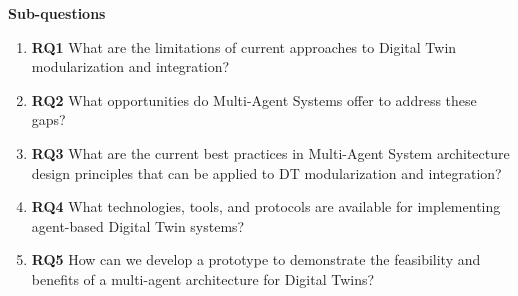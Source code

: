 \noindent \textbf{Sub-questions}
\begin{enumerate}
    \item \textbf{RQ1} What are the limitations of current approaches to Digital Twin modularization and integration? \\
    \item \textbf{RQ2} What opportunities do Multi-Agent Systems offer to address these gaps? \\
    \item \textbf{RQ3} What are the current best practices in Multi-Agent System architecture design principles that can be applied to DT modularization and integration? \\
    \item \textbf{RQ4} What technologies, tools, and protocols are available for implementing agent-based Digital Twin systems? \\
    \item \textbf{RQ5} How can we develop a prototype to demonstrate the feasibility and benefits of a multi-agent architecture for Digital Twins? \\
\end{enumerate}
